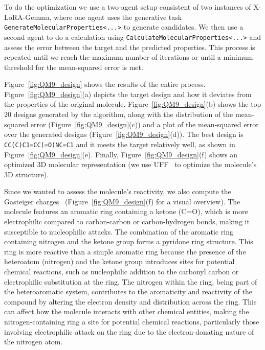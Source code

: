 To do the optimization we use a two-agent setup consistent of two instances of X-LoRA-Gemma, where one agent uses the generative task \texttt{GenerateMolecularProperties<...>} to generate candidates. We then use a second agent to do a calculation using \texttt{CalculateMolecularProperties<...>} and assess the error between the target and the predicted properties. This process is repeated until we reach the maximum number of iterations or until a minimum threshold for the mean-squared error is met.  

Figure~\ref{fig:QM9_design} shows the results of the entire process. Figure~\ref{fig:QM9_design}(a) depicts the target design and how it deviates from the properties of the original molecule. Figure~\ref{fig:QM9_design}(b) shows the top 20 designs generated by the algorithm, along with the distribution of the mean-squared error (Figure~\ref{fig:QM9_design}(c)) and a plot of the mean-squared error over the generated designs (Figure~\ref{fig:QM9_design}(d)). The best design is \texttt{CC(C)C1=CC(=O)NC=C1} and it meets the target relatively well, as shown in Figure~\ref{fig:QM9_design}(e). Finally, Figure~\ref{fig:QM9_design}(f) shows an optimized 3D molecular representation (we use UFF~\cite{Rappe1992UFFSimulations} to optimize the molecule's 3D structure). 

Since we wanted to assess the molecule's reactivity, we also compute the Gasteiger charges~\cite{Gasteiger1980IterativeCharges} (Figure~\ref{fig:QM9_design}(f) for a visual overview). The molecule features an aromatic ring containing a ketone (C=O), which is more electrophilic compared to carbon-carbon or carbon-hydrogen bonds, making it susceptible to nucleophilic attacks. The combination of the aromatic ring containing nitrogen and the ketone group forms a pyridone ring structure. This ring is more reactive than a simple aromatic ring because the presence of the heteroatom (nitrogen) and the ketone group introduces sites for potential chemical reactions, such as nucleophilic addition to the carbonyl carbon or electrophilic substitution at the ring. The nitrogen within the ring, being part of the heteroaromatic system, contributes to the aromaticity and reactivity of the compound by altering the electron density and distribution across the ring. This can affect how the molecule interacts with other chemical entities, making the nitrogen-containing ring a site for potential chemical reactions, particularly those involving electrophilic attack on the ring due to the electron-donating nature of the nitrogen atom.

